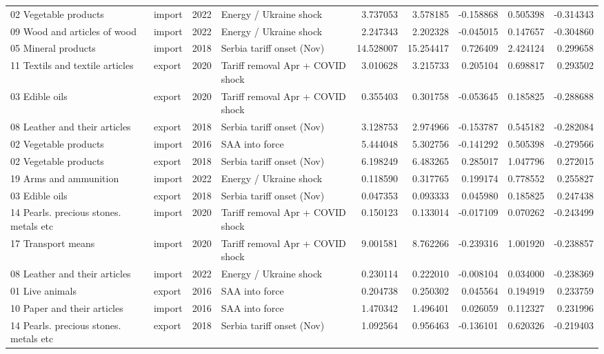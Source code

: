 \begin{tabular}{llrlrrrrr}
02 Vegetable products & import & 2022 & Energy / Ukraine shock & 3.737053 & 3.578185 & -0.158868 & 0.505398 & -0.314343 \\
09 Wood and articles of wood & import & 2022 & Energy / Ukraine shock & 2.247343 & 2.202328 & -0.045015 & 0.147657 & -0.304860 \\
05 Mineral products & import & 2018 & Serbia tariff onset (Nov) & 14.528007 & 15.254417 & 0.726409 & 2.424124 & 0.299658 \\
11 Textils and textile articles & export & 2020 & Tariff removal Apr + COVID shock & 3.010628 & 3.215733 & 0.205104 & 0.698817 & 0.293502 \\
03 Edible oils & export & 2020 & Tariff removal Apr + COVID shock & 0.355403 & 0.301758 & -0.053645 & 0.185825 & -0.288688 \\
08 Leather and their articles & export & 2018 & Serbia tariff onset (Nov) & 3.128753 & 2.974966 & -0.153787 & 0.545182 & -0.282084 \\
02 Vegetable products & import & 2016 & SAA into force & 5.444048 & 5.302756 & -0.141292 & 0.505398 & -0.279566 \\
02 Vegetable products & export & 2018 & Serbia tariff onset (Nov) & 6.198249 & 6.483265 & 0.285017 & 1.047796 & 0.272015 \\
19 Arms and ammunition & import & 2022 & Energy / Ukraine shock & 0.118590 & 0.317765 & 0.199174 & 0.778552 & 0.255827 \\
03 Edible oils & export & 2018 & Serbia tariff onset (Nov) & 0.047353 & 0.093333 & 0.045980 & 0.185825 & 0.247438 \\
14 Pearls. precious stones. metals etc & import & 2020 & Tariff removal Apr + COVID shock & 0.150123 & 0.133014 & -0.017109 & 0.070262 & -0.243499 \\
17 Transport means & import & 2020 & Tariff removal Apr + COVID shock & 9.001581 & 8.762266 & -0.239316 & 1.001920 & -0.238857 \\
08 Leather and their articles & import & 2022 & Energy / Ukraine shock & 0.230114 & 0.222010 & -0.008104 & 0.034000 & -0.238369 \\
01 Live animals & export & 2016 & SAA into force & 0.204738 & 0.250302 & 0.045564 & 0.194919 & 0.233759 \\
10 Paper and their articles & import & 2016 & SAA into force & 1.470342 & 1.496401 & 0.026059 & 0.112327 & 0.231996 \\
14 Pearls. precious stones. metals etc & export & 2018 & Serbia tariff onset (Nov) & 1.092564 & 0.956463 & -0.136101 & 0.620326 & -0.219403 \\

\end{tabular}

